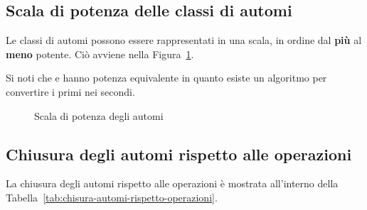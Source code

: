 \documentclass[italian, 10pt]{article}
\begin{document}
\subsection{Scala di potenza delle classi di automi}

Le classi di automi possono essere rappresentati in una scala, in ordine dal \textbf{più} al \textbf{meno} potente.
Ciò avviene nella Figura~\ref{fig:scala-potenza-automi}.

Si noti che \NFA e \FSA hanno potenza equivalente in quanto esiste un algoritmo per convertire i primi nei secondi.

\begin{figure}[htbp]
  \bigskip
  \centering
  \caption{Scala di potenza degli automi}
  \label{fig:scala-potenza-automi}
  \bigskip
\end{figure}

\subsection{Chiusura degli automi rispetto alle operazioni}

La chiusura degli automi rispetto alle operazioni è mostrata all'interno della Tabella~\ref{tab:chisura-automi-rispetto-operazioni}.

\begin{table}[htbp]
  \bigskip
  \centering
  \bigskip
  \caption{Chiusura degli automi rispetto alle operazioni}
  \label{tab:chisura-automi-rispetto-operazioni}
\end{table}
\end{document}
